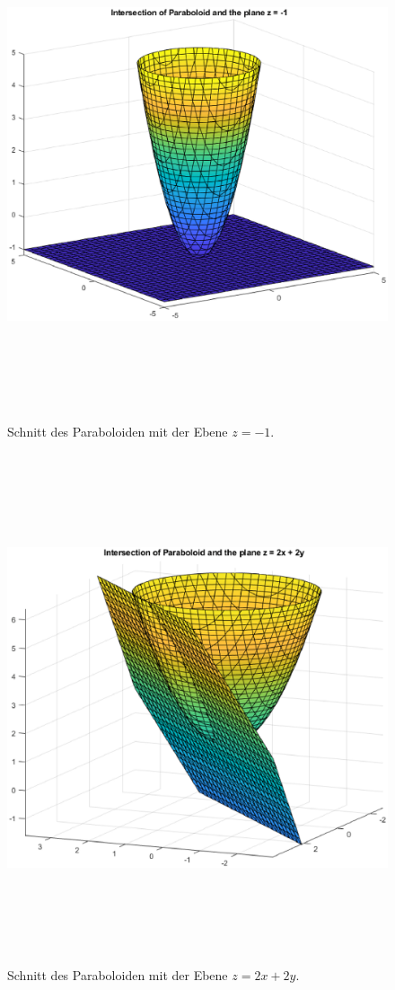 {\begin{figure}[ht]
\begin{center}
\includegraphics[width=15cm, height=15cm]{../A/analysis/isolines_and_isosurfaces_001_bi3.eps}
\caption{Schnitt des Paraboloiden mit der Ebene $z=-1$.}
\label{z=-1}
\end{center}
\end{figure}

\begin{figure}[ht]
\begin{center}
\includegraphics[width=15cm, height=15cm]{../A/analysis/isolines_and_isosurfaces_001_bii.eps}
\caption{Schnitt des Paraboloiden mit der Ebene $z=2x+2y$.}
\label{z=2x+2y}
\end{center}
\end{figure}


}

